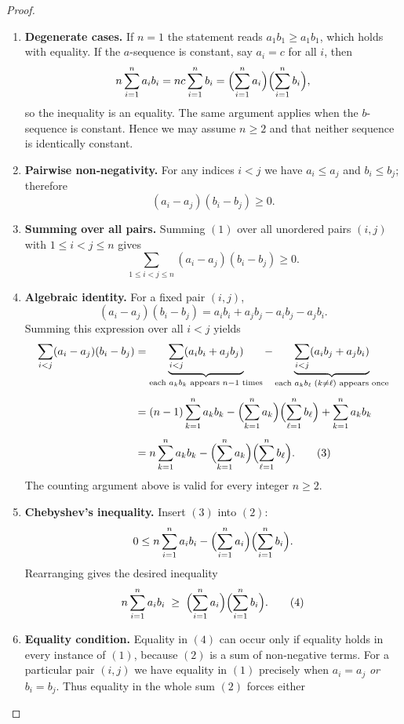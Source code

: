 \begin{proof}
\begin{enumerate}
\item \textbf{Degenerate cases.}  
If \(n=1\) the statement reads \(a_{1}b_{1}\ge a_{1}b_{1}\), which holds with equality.  
If the \(a\)-sequence is constant, say \(a_{i}=c\) for all \(i\), then
\[
n\sum_{i=1}^{n}a_i b_i
   = n c\sum_{i=1}^{n} b_i
   =\Bigl(\sum_{i=1}^{n} a_i\Bigr)\Bigl(\sum_{i=1}^{n} b_i\Bigr),
\]
so the inequality is an equality.  The same argument applies when the \(b\)-sequence is constant.  
Hence we may assume \(n\ge2\) and that neither sequence is identically constant.

\item \textbf{Pairwise non‑negativity.}  
For any indices \(i<j\) we have \(a_i\le a_j\) and \(b_i\le b_j\); therefore
\[
(a_i-a_j)(b_i-b_j)\ge0. \tag{1}
\]

\item \textbf{Summing over all pairs.}  
Summing \((1)\) over all unordered pairs \((i,j)\) with \(1\le i<j\le n\) gives
\[
\sum_{1\le i<j\le n}(a_i-a_j)(b_i-b_j)\ge0. \tag{2}
\]

\item \textbf{Algebraic identity.}  
For a fixed pair \((i,j)\),
\[
(a_i-a_j)(b_i-b_j)=a_i b_i + a_j b_j - a_i b_j - a_j b_i .
\]
Summing this expression over all \(i<j\) yields
\begin{align*}
\sum_{i<j}(a_i-a_j)(b_i-b_j)
&= \underbrace{\sum_{i<j}(a_i b_i + a_j b_j)}_{\text{each }a_k b_k\text{ appears }n-1\text{ times}}
   -\underbrace{\sum_{i<j}(a_i b_j + a_j b_i)}_{\text{each }a_k b_\ell\;(k\neq\ell)\text{ appears once}} \\[4pt]
&= (n-1)\sum_{k=1}^{n}a_k b_k
   -\Bigl(\sum_{k=1}^{n}a_k\Bigr)\Bigl(\sum_{\ell=1}^{n}b_\ell\Bigr)
   +\sum_{k=1}^{n}a_k b_k \\[4pt]
&= n\sum_{k=1}^{n}a_k b_k
   -\Bigl(\sum_{k=1}^{n}a_k\Bigr)\Bigl(\sum_{\ell=1}^{n}b_\ell\Bigr). \tag{3}
\end{align*}
The counting argument above is valid for every integer \(n\ge2\).

\item \textbf{Chebyshev’s inequality.}  
Insert \((3)\) into \((2)\):
\[
0\le
n\sum_{i=1}^{n}a_i b_i
-\Bigl(\sum_{i=1}^{n}a_i\Bigr)\Bigl(\sum_{i=1}^{n}b_i\Bigr).
\]
Rearranging gives the desired inequality
\[
n\sum_{i=1}^{n}a_i b_i\;\ge\;
\Bigl(\sum_{i=1}^{n}a_i\Bigr)\Bigl(\sum_{i=1}^{n}b_i\Bigr). \tag{4}
\]

\item \textbf{Equality condition.}  
Equality in \((4)\) can occur only if equality holds in every instance of \((1)\), because \((2)\) is a sum of non‑negative terms.  
For a particular pair \((i,j)\) we have equality in \((1)\) precisely when \(a_i=a_j\) \emph{or} \(b_i=b_j\).  
Thus equality in the whole sum \((2)\) forces either


\end{enumerate}
\end{proof}
